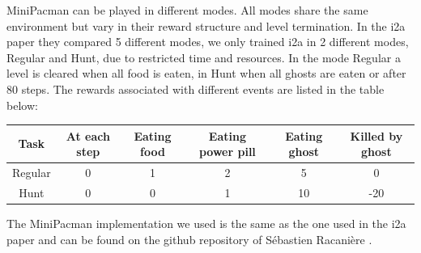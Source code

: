 MiniPacman can be played in different modes. All modes share the same environment but vary in their reward structure and level termination.
In the i2a paper they compared 5 different modes, we only trained i2a in 2 different modes, Regular and Hunt, due to restricted time and resources. In the mode Regular a level is cleared when all food is eaten, in Hunt when all ghosts are eaten or after 80 steps. 
The rewards associated with different events are listed in the table below:

\begin{center}
	\begin{tabular}{| c | c | c | c |c | c | }
	\hline
	Task 	& At each step 	& Eating food 
		& Eating power pill & Eating ghost  & Killed by ghost\\
	\hline
	Regular & 0		& 1 	& 2		& 5		& 0 \\
	Hunt	& 0		& 0		& 1		& 10	& -20\\
	\hline
	\end{tabular}
\end{center}

The MiniPacman implementation we used is the same as the one used in the i2a paper and can be found on the github repository of S{\'{e}}bastien Racani{\`{e}}re \cite{MiniPacmanRepo}.


